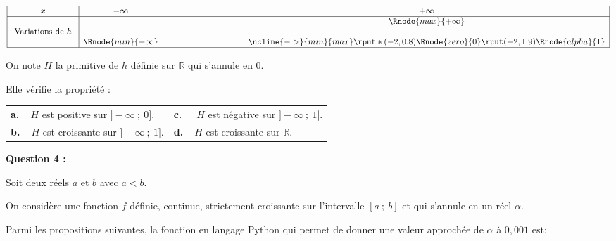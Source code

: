 \documentclass[10pt]{article}
\providecommand{\R}{\mathbb{R}}
\begin{document}
\begin{center}
{\renewcommand{\arraystretch}{1.3}
\def\esp{\hspace*{3cm}}
$\begin{array}{|c| *3{c}|}
\hline
 x & -\infty   & \esp & +\infty \\
 \hline
  &   &    & \Rnode{max}{+\infty}   \\
\text{ Variations de $h$ } & &  &  \\
 &     \Rnode{min}{-\infty} & & 
\ncline{->}{min}{max}
\rput*(-2,0.8){\Rnode{zero}{0}}
\rput(-2,1.9){\Rnode{alpha}{1}}
\\
\hline
\end{array}$
}
\end{center}

On note $H$ la primitive de $h$ définie sur $\R$ qui s'annule en $0$.

Elle vérifie la propriété :

\begin{tabularx}{\linewidth}{X X}
\textbf{a.~~}$H$ est positive sur $]-\infty~;~0]$.& \textbf{c.~~} $H$ est négative sur $]-\infty~;~1]$.\\
\textbf{b.~~}$H$ est croissante sur $]-\infty~;~1]$.& \textbf{d.~~}$H$ est croissante sur $\R$.
\end{tabularx}



\textbf{Question 4 :}

\medskip

Soit deux réels $a$ et $b$ avec $a < b$.

On considère une fonction $f$ définie, continue, strictement croissante sur l'intervalle
$[a~;~b]$ et qui s'annule en un réel $\alpha$.

Parmi les propositions suivantes, la fonction en langage Python qui permet de donner
une valeur approchée de $\alpha$ à $0,001$ est:

\smallskip
\end{document}
